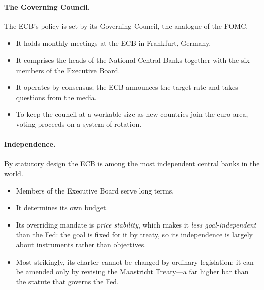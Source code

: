 \paragraph{The Governing Council.}
The ECB's policy is set by its Governing Council, the analogue of the FOMC.
\begin{itemize}
    \item It holds monthly meetings at the ECB in Frankfurt, Germany.
    \item It comprises the heads of the National Central Banks together with the six members of the Executive Board.
    \item It operates by consensus; the ECB announces the target rate and takes questions from the media.
    \item To keep the council at a workable size as new countries join the euro area, voting proceeds on a system of rotation.
\end{itemize}

\paragraph{Independence.}
By statutory design the ECB is among the most independent central banks in the world.
\begin{itemize}
    \item Members of the Executive Board serve long terms.
    \item It determines its own budget.
    \item Its overriding mandate is \emph{price stability}, which makes it \emph{less goal-independent} than the Fed: the goal is fixed for it by treaty, so its independence is largely about instruments rather than objectives.
    \item Most strikingly, its charter cannot be changed by ordinary legislation; it can be amended only by revising the Maastricht Treaty---a far higher bar than the statute that governs the Fed.
\end{itemize}

